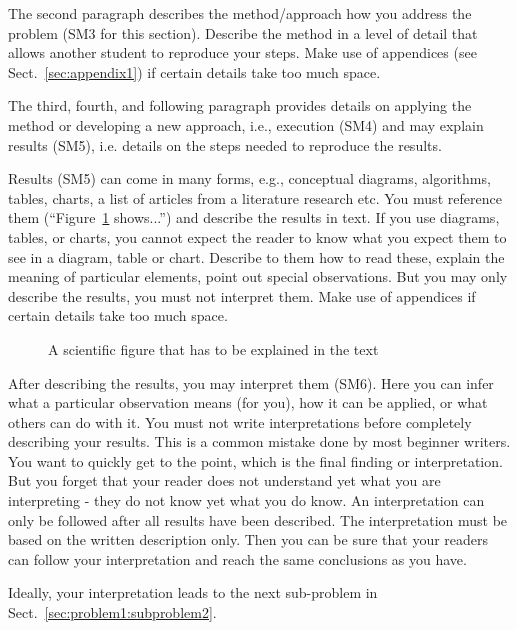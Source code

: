 \documentclass[12pt,a4paper,footinclude=true,twoside,headinclude=true]{report}
\begin{document}
\textsf{The second paragraph describes the method/approach how you address the problem (SM3 for this section).} Describe the method in a level of detail that allows another student to reproduce your steps. Make use of appendices (see Sect.~\ref{sec:appendix1}) if certain details take too much space.

\textsf{The third, fourth, and following paragraph provides details on applying the method or developing a new approach, i.e., execution (SM4) and may explain results (SM5)}, i.e. details on the steps needed to reproduce the results. 

Results (SM5) can come in many forms, e.g., conceptual diagrams, algorithms, tables, charts, a list of articles from a literature research etc. You must reference them (``Figure~\ref{fig:my_label} shows...'') and describe the results in text. If you use diagrams, tables, or charts, you cannot expect the reader to know what you expect them to see in a diagram, table or chart. Describe to them how to read these, explain the meaning of particular elements, point out special observations. But you may only describe the results, you must not interpret them. Make use of appendices if certain details take too much space.

\begin{figure}
    \centering
    \caption{A scientific figure that has to be explained in the text}
    \label{fig:my_label}
\end{figure}

\textsf{After describing the results, you may interpret them (SM6).} Here you can infer what a particular observation means (for you), how it can be applied, or what others can do with it. You must not write interpretations before completely describing your results. This is a common mistake done by most beginner writers. You want to quickly get to the point, which is the final finding or interpretation. But you forget that your reader does not understand yet what you are interpreting - they do not know yet what you do know. An interpretation can only be followed after all results have been described. The interpretation must be based on the written description only. Then you can be sure that your readers can follow your interpretation and reach the same conclusions as you have.

Ideally, your interpretation leads to the next sub-problem in Sect.~\ref{sec:problem1:subproblem2}.

\end{document}
